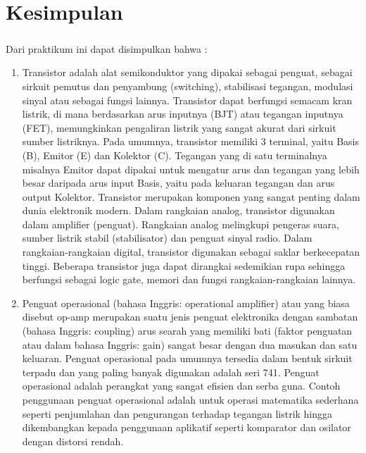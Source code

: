\documentclass[12pt,a4paper]{article}
\begin{document}
\newpage
\section{Kesimpulan}
\subparagraph{ }
Dari praktikum ini dapat disimpulkan bahwa :
\begin{enumerate}

\item Transistor adalah alat semikonduktor yang dipakai sebagai penguat, sebagai sirkuit pemutus dan penyambung (switching), stabilisasi tegangan, modulasi sinyal atau sebagai fungsi lainnya. Transistor dapat berfungsi semacam kran listrik, di mana berdasarkan arus inputnya (BJT) atau tegangan inputnya (FET), memungkinkan pengaliran listrik yang sangat akurat dari sirkuit sumber listriknya. Pada umumnya, transistor memiliki 3 terminal, yaitu Basis (B), Emitor (E) dan Kolektor (C). Tegangan yang di satu terminalnya misalnya Emitor dapat dipakai untuk mengatur arus dan tegangan yang lebih besar daripada arus input Basis, yaitu pada keluaran tegangan dan arus output Kolektor. Transistor merupakan komponen yang sangat penting dalam dunia elektronik modern. Dalam rangkaian analog, transistor digunakan dalam amplifier (penguat). Rangkaian analog melingkupi pengeras suara, sumber listrik stabil (stabilisator) dan penguat sinyal radio. Dalam rangkaian-rangkaian digital, transistor digunakan sebagai saklar berkecepatan tinggi. Beberapa transistor juga dapat dirangkai sedemikian rupa sehingga berfungsi sebagai logic gate, memori dan fungsi rangkaian-rangkaian lainnya.

\item Penguat operasional (bahasa Inggris: operational amplifier) atau yang biasa disebut op-amp merupakan suatu jenis penguat elektronika dengan sambatan (bahasa Inggris: coupling) arus searah yang memiliki bati (faktor penguatan atau dalam bahasa Inggris: gain) sangat besar dengan dua masukan dan satu keluaran. Penguat operasional pada umumnya tersedia dalam bentuk sirkuit terpadu dan yang paling banyak digunakan adalah seri 741.
Penguat operasional adalah perangkat yang sangat efisien dan serba guna. Contoh penggunaan penguat operasional adalah untuk operasi matematika sederhana seperti penjumlahan dan pengurangan terhadap tegangan listrik hingga dikembangkan kepada penggunaan aplikatif seperti komparator dan osilator dengan distorsi rendah.


\end{enumerate}
\end{document}
